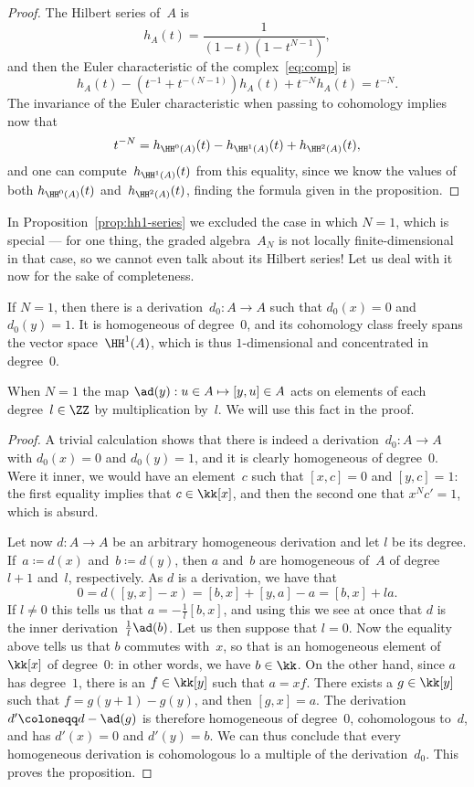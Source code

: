 \begin{proof}
The Hilbert series
of~$A$ is
  \[
  h_A(t) = \frac{1}{(1-t)(1-t^{N-1})},
  \]
and then the Euler characteristic of the complex~\eqref{eq:comp} is
  \[
  h_A(t) - (t^{-1}+t^{-(N-1)})h_A(t)+t^{-N}h_A(t) = t^{-N}.
  \]
The invariance of the Euler characteristic when passing to cohomology
implies now that
  \[
  t^{-N} = h_{\HH^0(A)}(t) - h_{\HH^1(A)}(t) + h_{\HH^2(A)}(t),
  \]
and one can compute~$h_{\HH^1(A)}(t)$ from this equality, since we know the
values of both $h_{\HH^0(A)}(t)$ and~$h_{\HH^2(A)}(t)$, finding the formula
given in the proposition.
\end{proof}

In Proposition~\ref{prop:hh1-series} we excluded the case in which $N=1$,
which is special --- for one thing, the graded algebra~$A_N$ is not locally
finite-dimensional in that case, so we cannot even talk about its Hilbert
series! Let us deal with it now for the sake of completeness.

\begin{Proposition}\label{prop:hh1-n1}
If $N=1$, then there is a derivation~$d_0:A\to A$ such that $d_0(x)=0$
and~$d_0(y)=1$. It is homogeneous of degree~$0$, and its cohomology class
freely spans the vector space~$\HH^1(A)$, which is thus $1$-dimensional and
concentrated in degree~$0$.
\end{Proposition}

When $N=1$ the map $\ad(y):u\in A\mapsto [y,u]\in A$ acts on elements of
each degree~$l\in\ZZ$ by multiplication by~$l$. We will use this fact in
the proof.

\begin{proof}
A trivial calculation shows that there is indeed a derivation~$d_0:A\to A$
with $d_0(x)=0$ and $d_0(y)=1$, and it is clearly homogeneous of
degree~$0$. Were it inner, we would have an element~$c$ such that $[x,c]=0$
and $[y,c]=1$: the first equality implies that $c\in\kk[x]$, and then the
second one that $x^Nc'=1$, which is absurd.

Let now $d:A\to A$ be an arbitrary homogeneous derivation and let $l$ be
its degree. If~$a\coloneqq d(x)$ and~$b\coloneqq d(y)$, then $a$ and~$b$
are homogeneous of~$A$ of degree~$l+1$ and~$l$, respectively. As $d$ is a
derivation, we have that
  \[ \label{eq:zero}
  0 = d([y,x]-x) = [b,x] + [y,a] - a = [b, x] + la.
  \]
If $l\neq0$ this tells us that $a=-\frac{1}{l}[b,x]$, and using this we see
at once that $d$ is the inner derivation~$\tfrac{1}{l}\ad(b)$. Let us then
suppose that $l=0$. Now the equality above tells us that $b$
commutes with~$x$, so that is an homogeneous element of~$\kk[x]$ of
degree~$0$: in other words, we have $b\in\kk$. On the other hand, since $a$
has degree~$1$, there is an $f\in\kk[y]$ such that $a=xf$. There exists a
$g\in\kk[y]$ such that $f=g(y+1)-g(y)$, and then $[g,x]=a$. The
derivation~$d'\coloneqq d-\ad(g)$ is therefore homogeneous of degree~$0$,
cohomologous to~$d$, and has $d'(x)=0$ and $d'(y)=b$. We can thus conclude
that every homogeneous derivation is cohomologous lo a multiple of the
derivation~$d_0$. This proves the proposition.
\end{proof}

